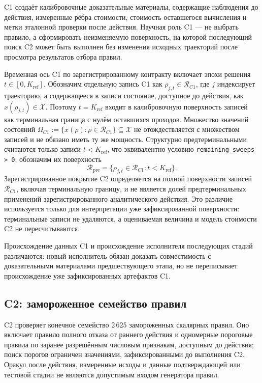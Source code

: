 C1 создаёт калибровочные доказательные материалы, содержащие наблюдения до
действия, измеренные рёбра стоимости, стоимость оставшегося вычисления и метки
эталонной проверки после действия. Научная роль C1 --- не выбрать правило, а сформировать
неизменяемую поверхность, на которой последующий поиск C2 может быть выполнен
без изменения исходных траекторий после просмотра результатов отбора правил.

Временная ось C1 по зарегистрированному контракту включает эпохи решения
$t\in[0,K_{\mathrm{ref}}]$. Обозначим отдельную запись C1 как
$\rho_{j,t}\in\mathcal R_{C1}$, где $j$ индексирует траекторию, а содержащееся
в записи состояние, доступное до действия, как
$x(\rho_{j,t})\in\mathcal X$. Поэтому $t=K_{\mathrm{ref}}$ входит в
калибровочную поверхность записей как терминальная граница с нулём оставшихся
проходов. Множество значений состояний
$\Omega_{C1}:=\{x(\rho):\rho\in\mathcal R_{C1}\}\subseteq\mathcal X$ не отождествляется с
множеством записей и не обязано иметь ту же мощность. Структурно
предтерминальными считаются только записи $t<K_{\mathrm{ref}}$, что
эквивалентно условию \texttt{remaining\_sweeps > 0}; обозначим их поверхность
\[
  \mathcal R_{\mathrm{pre}}
  =\{\rho_{j,t}\in\mathcal R_{C1}:t<K_{\mathrm{ref}}\}.
\]
Зарегистрированное покрытие C2 определяется на полной поверхности записей
$\mathcal R_{C1}$, включая терминальную границу, и не является долей
предтерминальных применений зарегистрированного аналитического действия. Это различие используется только для
интерпретации уже зафиксированной поверхности: терминальные записи не удаляются,
а оцениваемая величина и модель стоимости C2 не пересчитываются.

Происхождение данных C1 и происхождение исполнителя последующих стадий
различаются: новый исполнитель обязан доказать совместимость с доказательными
материалами предшествующего этапа, но не переписывает происхождение уже
зафиксированных артефактов C1.

\subsection{C2: замороженное семейство правил}

C2 проверяет конечное семейство 2\,625 замороженных скалярных правил. Оно
включает правило полного отказа от раннего действия и одномерные пороговые
правила по
заранее разрешённым числовым признакам, доступным до действия; поиск порогов
ограничен значениями, зафиксированными до выполнения C2. Оракул после действия,
измеренные исходы и данные подтверждающей или тестовой стадии не являются
допустимым входом генератора правил.

